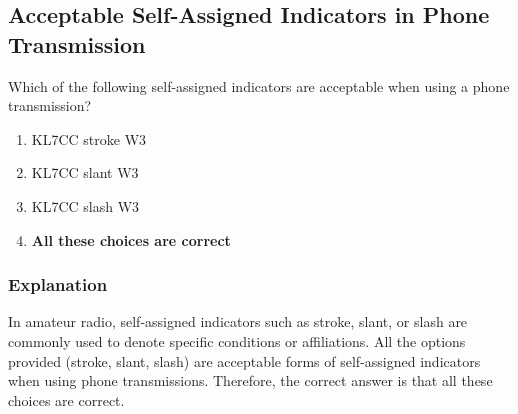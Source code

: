 \subsection{Acceptable Self-Assigned Indicators in Phone Transmission}
\label{T1F06}

\begin{tcolorbox}[colback=gray!10!white,colframe=black!75!black,title=T1F06]
Which of the following self-assigned indicators are acceptable when using a phone transmission?
\begin{enumerate}[label=\Alph*,noitemsep]
    \item KL7CC stroke W3
    \item KL7CC slant W3
    \item KL7CC slash W3
    \item \textbf{All these choices are correct}
\end{enumerate}
\end{tcolorbox}

\subsubsection*{Explanation}
In amateur radio, self-assigned indicators such as stroke, slant, or slash are commonly used to denote specific conditions or affiliations. All the options provided (stroke, slant, slash) are acceptable forms of self-assigned indicators when using phone transmissions. Therefore, the correct answer is that all these choices are correct.